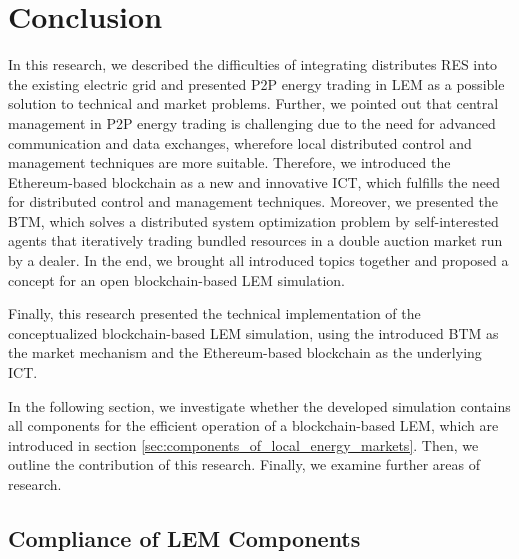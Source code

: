 \section{Conclusion}
In this research, we described the difficulties of integrating distributes RES into 
the existing electric grid and presented P2P energy trading in LEM
as a possible solution to technical and market problems. Further, we pointed out that central
management in P2P energy trading is challenging due to the need for advanced communication and data exchanges,
wherefore local distributed control and management techniques are more suitable.
Therefore, we introduced the Ethereum-based blockchain as a new and innovative ICT, 
which fulfills the need for distributed control and management techniques.
Moreover, we presented the BTM, which solves a distributed system
optimization problem by self-interested agents that iteratively trading bundled resources in a double
auction market run by a dealer. 
In the end, we brought all introduced topics together and proposed a concept for an open blockchain-based 
LEM simulation.

Finally, this research presented the technical implementation of the conceptualized blockchain-based
LEM simulation, using the introduced BTM as the market mechanism and 
the Ethereum-based blockchain as the underlying ICT.

In the following section, we investigate whether the developed simulation contains all components for the efficient operation of a blockchain-based LEM, which are introduced in section \ref{sec:components_of_local_energy_markets}. 
Then, we outline the contribution of this research. Finally, we examine further areas of research.

\subsection{Compliance of LEM Components}
\label{sec:compliance_of_components}

